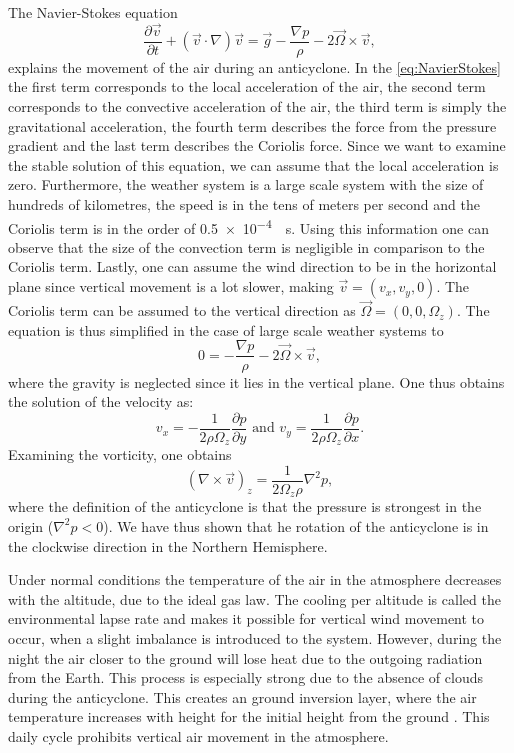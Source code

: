 The Navier-Stokes equation
\begin{equation} \frac{\partial \vec{v}}{\partial t} + (\vec{v} \cdot \nabla)\vec{v} = \vec{g} - \frac{\nabla p}{\rho} - 2\vec{\Omega} \times \vec{v}, \label{eq:NavierStokes} \end{equation}
explains the movement of the air during an anticyclone. In the \autoref{eq:NavierStokes} the first term corresponds to the local acceleration of the air, the second term corresponds to the convective acceleration of the air, the third term is simply the gravitational acceleration, the fourth term describes the force from the pressure gradient and the last term describes the Coriolis force. Since we want to examine the stable solution of this equation, we can assume that the local acceleration is zero. Furthermore, the weather system is a large scale system with the size of hundreds of kilometres, the speed is in the tens of meters per second and the Coriolis term is in the order of \SI{0.5e-4}{\per\s}. Using this information one can observe that the size of the convection term is negligible in comparison to the Coriolis term. Lastly, one can assume the wind direction to be in the horizontal plane since vertical movement is a lot slower, making $\vec{v}=(v_x,v_y,0)$. The Coriolis term can be assumed to the vertical direction as $\vec{\Omega}=(0,0,\Omega_z)$. The equation is thus simplified in the case of large scale weather systems to
\begin{equation} 0 = - \frac{\nabla p}{\rho} - 2{\vec{\Omega}} \times \vec{v}, \label{eq:NavierStokes2} \end{equation}
where the gravity is neglected since it lies in the vertical plane. One thus obtains the solution of the velocity as:
\begin{equation} v_x=-\frac{1}{2\rho\Omega_z}\frac{\partial p}{\partial y}\text{ and }v_y=\frac{1}{2\rho\Omega_z}\frac{\partial p}{\partial x}. 
\end{equation}
Examining the vorticity, one obtains  
\begin{equation}
    (\nabla \times \vec{v})_z  = \frac{1}{2\Omega_z\rho}\nabla^2p,
\end{equation} 
where the definition of the anticyclone is that the pressure is strongest in the origin ($\nabla^2p<0$). We have thus shown that he rotation of the anticyclone is in the clockwise direction in the Northern Hemisphere. 

Under normal conditions the temperature of the air in the atmosphere decreases with the altitude, due to the ideal gas law. The cooling per altitude is called the environmental lapse rate and makes it possible for vertical wind movement to occur, when a slight imbalance is introduced to the system. However, during the night the air closer to the ground will lose heat due to the outgoing radiation from the Earth. This process is especially strong due to the absence of clouds during the anticyclone. This creates an ground inversion layer, where the air temperature increases with height for the initial height from the ground \cite{gregohareWeatherClimateClimate2005}. This daily cycle prohibits vertical air movement in the atmosphere.

